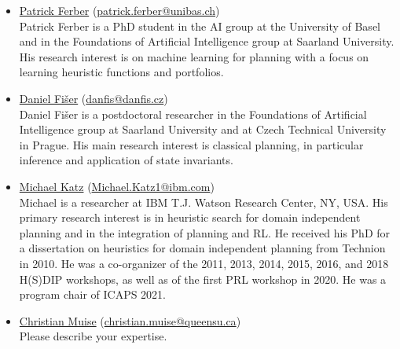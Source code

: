 \documentclass[10pt]{article}
\begin{document}
\newcommand{\organizer}[4]{\href{#2}{#1} (\href{mailto:#3}{#3})\\{#4}}
\begin{itemize}

\item \organizer{Patrick Ferber}{https://ai.dmi.unibas.ch/people/ferber/}{patrick.ferber@unibas.ch}
{Patrick Ferber is a PhD student in the AI group at the University of 
Basel and in the Foundations of Artificial Intelligence group at 
Saarland University. His research interest is on machine learning for 
planning with a focus on learning heuristic functions and portfolios.}

\item \organizer{Daniel Fi\v{s}er}{https://www.danfis.cz}{danfis@danfis.cz}
{Daniel Fi\v{s}er is a postdoctoral researcher
in the Foundations of Artificial Intelligence group at Saarland University
and at Czech Technical University in Prague.
His main research interest is classical planning, in particular inference and
application of state invariants.}

\item \organizer{Michael Katz}{https://researcher.watson.ibm.com/researcher/view.php?person=ibm-Michael.Katz1}{Michael.Katz1@ibm.com}
Michael is a researcher at IBM T.J. Watson Research Center, NY, USA. His
primary research interest is in heuristic search for domain independent
planning and in the integration of planning and RL. He received his PhD for a
dissertation on heuristics for domain independent planning from Technion in
2010. He was a co-organizer of the 2011, 2013, 2014, 2015, 2016, and 2018
H(S)DIP workshops, as well as of the first PRL workshop in 2020. He was a
program chair of ICAPS 2021.

\item \organizer{Christian Muise}{http://www.haz.ca/}{christian.muise@queensu.ca}
{Please describe your expertise.}





\end{itemize}
\end{document}
